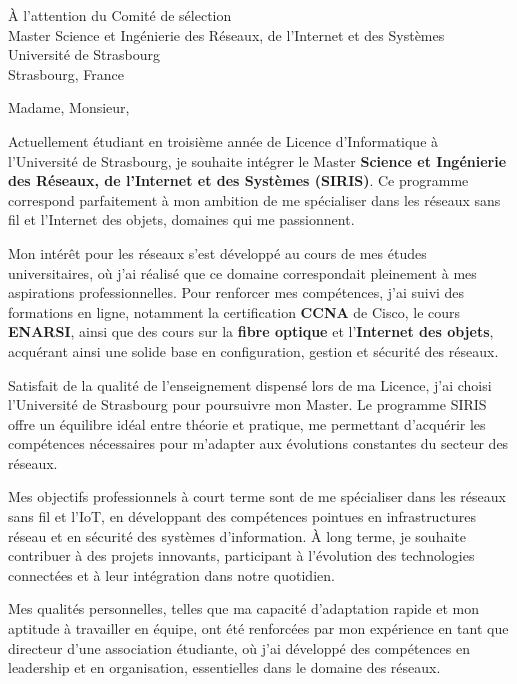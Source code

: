 \documentclass[11pt]{letter}
\begin{document}
\begin{letter}{%
À l'attention du Comité de sélection\\
Master Science et Ingénierie des Réseaux, de l'Internet et des Systèmes\\
Université de Strasbourg\\
Strasbourg, France}

\date{\today}

\opening{Madame, Monsieur,}

\onehalfspacing

Actuellement étudiant en troisième année de Licence d'Informatique à l'Université de Strasbourg, je souhaite intégrer le Master \textbf{Science et Ingénierie des Réseaux, de l'Internet et des Systèmes (SIRIS)}. Ce programme correspond parfaitement à mon ambition de me spécialiser dans les réseaux sans fil et l'Internet des objets, domaines qui me passionnent.

Mon intérêt pour les réseaux s'est développé au cours de mes études universitaires, où j'ai réalisé que ce domaine correspondait pleinement à mes aspirations professionnelles. Pour renforcer mes compétences, j'ai suivi des formations en ligne, notamment la certification \textbf{CCNA} de Cisco, le cours \textbf{ENARSI}, ainsi que des cours sur la \textbf{fibre optique} et l'\textbf{Internet des objets}, acquérant ainsi une solide base en configuration, gestion et sécurité des réseaux.

Satisfait de la qualité de l'enseignement dispensé lors de ma Licence, j'ai choisi l'Université de Strasbourg pour poursuivre mon Master. Le programme SIRIS offre un équilibre idéal entre théorie et pratique, me permettant d'acquérir les compétences nécessaires pour m'adapter aux évolutions constantes du secteur des réseaux.

Mes objectifs professionnels à court terme sont de me spécialiser dans les réseaux sans fil et l'IoT, en développant des compétences pointues en infrastructures réseau et en sécurité des systèmes d'information. À long terme, je souhaite contribuer à des projets innovants, participant à l'évolution des technologies connectées et à leur intégration dans notre quotidien.

Mes qualités personnelles, telles que ma capacité d'adaptation rapide et mon aptitude à travailler en équipe, ont été renforcées par mon expérience en tant que directeur d'une association étudiante, où j'ai développé des compétences en leadership et en organisation, essentielles dans le domaine des réseaux.


\end{letter}
\end{document}
